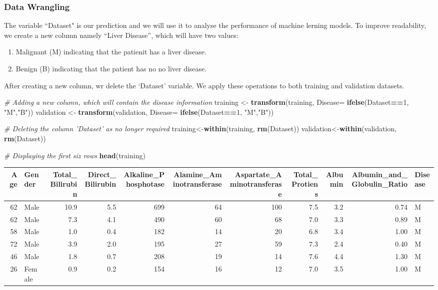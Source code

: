 \documentclass[]{article}
\newenvironment{Shaded}{\begin{snugshade}}{\end{snugshade}}
\newcommand{\CommentTok}[1]{\textcolor[rgb]{0.56,0.35,0.01}{\textit{#1}}}
\newcommand{\DataTypeTok}[1]{\textcolor[rgb]{0.13,0.29,0.53}{#1}}
\newcommand{\DecValTok}[1]{\textcolor[rgb]{0.00,0.00,0.81}{#1}}
\newcommand{\KeywordTok}[1]{\textcolor[rgb]{0.13,0.29,0.53}{\textbf{#1}}}
\newcommand{\NormalTok}[1]{#1}
\newcommand{\OperatorTok}[1]{\textcolor[rgb]{0.81,0.36,0.00}{\textbf{#1}}}
\newcommand{\StringTok}[1]{\textcolor[rgb]{0.31,0.60,0.02}{#1}}
\begin{document}
\subsubsection{Data Wrangling}
\label{sec:dw}

The variable ``Dataset" is our prediction and we will use it to analyse
the performance of machine lerning models. To improve readability, we
create a new column namely ``Liver Disease'', which will have two
values:

\begin{enumerate}
\item Malignant (M) indicating that the patienit has a liver disease.
\item Benign (B) indicating that the patient has no no liver disease.
\end{enumerate}

After creating a new column, wr delete the `Dataset' variable. We apply
these operations to both training and validation datasets.

\begin{Shaded}
\begin{Highlighting}[]
\CommentTok{# Adding a new column, which will contain the disease information}
\NormalTok{training <-}\StringTok{ }\KeywordTok{transform}\NormalTok{(training, }\DataTypeTok{Disease=} \KeywordTok{ifelse}\NormalTok{(Dataset}\OperatorTok{==}\DecValTok{1}\NormalTok{, }\StringTok{"M"}\NormalTok{,}\StringTok{"B"}\NormalTok{))}
\NormalTok{validation <-}\StringTok{ }\KeywordTok{transform}\NormalTok{(validation, }\DataTypeTok{Disease=} \KeywordTok{ifelse}\NormalTok{(Dataset}\OperatorTok{==}\DecValTok{1}\NormalTok{, }\StringTok{"M"}\NormalTok{,}\StringTok{"B"}\NormalTok{))}

\CommentTok{# Deleting the column 'Dataset' as no longer required}
\NormalTok{training<-}\KeywordTok{within}\NormalTok{(training, }\KeywordTok{rm}\NormalTok{(Dataset))}
\NormalTok{validation<-}\KeywordTok{within}\NormalTok{(validation, }\KeywordTok{rm}\NormalTok{(Dataset))}

\CommentTok{# Displaying the first siz rows}
\KeywordTok{head}\NormalTok{(training)}
\end{Highlighting}
\end{Shaded}

\begin{longtable}[]{@{}rlrrrrrrrrl@{}}
\toprule
Age & Gender & Total\_Bilirubin & Direct\_Bilirubin &
Alkaline\_Phosphotase & Alamine\_Aminotransferase &
Aspartate\_Aminotransferase & Total\_Protiens & Albumin &
Albumin\_and\_Globulin\_Ratio & Disease\tabularnewline
\midrule
\endhead
62 & Male & 10.9 & 5.5 & 699 & 64 & 100 & 7.5 & 3.2 & 0.74 &
M\tabularnewline
62 & Male & 7.3 & 4.1 & 490 & 60 & 68 & 7.0 & 3.3 & 0.89 &
M\tabularnewline
58 & Male & 1.0 & 0.4 & 182 & 14 & 20 & 6.8 & 3.4 & 1.00 &
M\tabularnewline
72 & Male & 3.9 & 2.0 & 195 & 27 & 59 & 7.3 & 2.4 & 0.40 &
M\tabularnewline
46 & Male & 1.8 & 0.7 & 208 & 19 & 14 & 7.6 & 4.4 & 1.30 &
M\tabularnewline
26 & Female & 0.9 & 0.2 & 154 & 16 & 12 & 7.0 & 3.5 & 1.00 &
M\tabularnewline
\bottomrule
\end{longtable}
\end{document}
